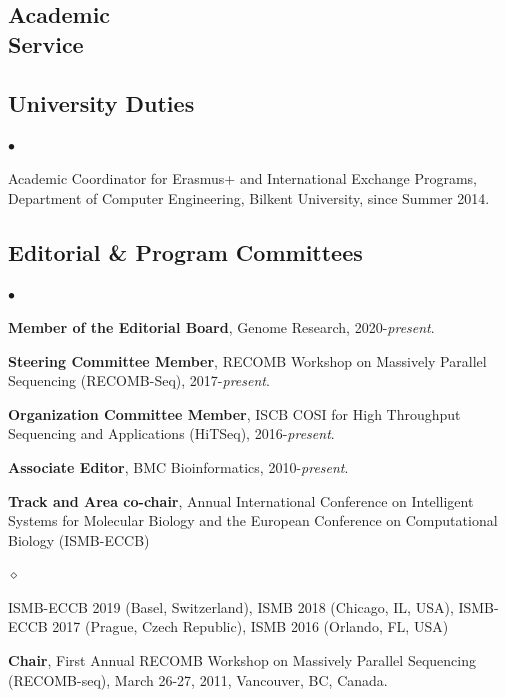 \documentclass[margin,line]{res}
\newenvironment{list2}{
  \begin{list}{$\bullet$}{%
      \setlength{\itemsep}{0.1cm}
      \setlength{\parsep}{0in} \setlength{\parskip}{0in}
      \setlength{\topsep}{0in} \setlength{\partopsep}{0in} 
      \setlength{\leftmargin}{0.2in}}}{\end{list}}
\newenvironment{list3}{
  \begin{list}{$\diamond$}{%
      \setlength{\itemsep}{0in}
      \setlength{\parsep}{0.1cm} \setlength{\parskip}{0.1cm}
      \setlength{\topsep}{0.1cm} \setlength{\partopsep}{0.1cm} 
      \setlength{\leftmargin}{0.2in}}}{\end{list}}
\begin{document}
\begin{resume}
\vspace*{-.2cm}
\section{\sc Academic \\ Service}
\vspace{-0.3cm}
\subsection{\small \sc University Duties}
\begin{list2}
\item
  Academic Coordinator for Erasmus+ and International Exchange Programs, Department of Computer Engineering, Bilkent University, since Summer 2014.
\end{list2}
\vspace{-0.4cm}

\subsection{\small \sc Editorial \& Program Committees}
\begin{list2}
\item
    \textbf{Member of the Editorial Board}, Genome Research, 2020-\textit{present}.
\item
  \textbf{Steering Committee Member}, RECOMB Workshop on Massively Parallel Sequencing (RECOMB-Seq), 2017-{\it present}.
\item
  \textbf{Organization Committee Member}, ISCB COSI for High Throughput Sequencing and Applications (HiTSeq),
  2016-{\it present}.
\item
  \textbf{Associate Editor}, BMC Bioinformatics, 2010-{\it present}.


\item
  \textbf{Track and Area co-chair}, Annual International Conference on Intelligent Systems for Molecular Biology and the European Conference on 
  Computational Biology (ISMB-ECCB)
  \begin{list3}
    \item ISMB-ECCB 2019 (Basel, Switzerland), ISMB 2018 (Chicago, IL, USA), ISMB-ECCB 2017 (Prague, Czech Republic), ISMB 2016 (Orlando, FL, USA)
  \end{list3}

\item
  \textbf{Chair}, First Annual RECOMB Workshop on Massively Parallel Sequencing (RECOMB-seq), March 26-27, 2011, Vancouver, BC, Canada.
  

\end{list2}
\end{resume}
\end{document}
